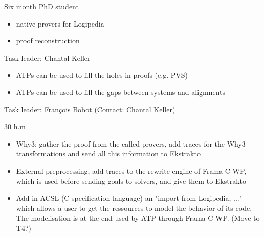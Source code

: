 \begin{workpackage}[id=atpetc,wphases=0-48,type=RTD,
  short=ATPs etc.,%
  title={ATP, SAT, SMT, Model checkers},
  lead=Lie,
  LieRM=10]
\begin{tasklist}
\begin{task}[id=reconstruction, title=ATPs for Logipedia]

  Six month PhD student

\begin{itemize}
\item native provers for Logipedia
\item proof reconstruction
\end{itemize}

\end{task}


\begin{task}[id=readiness, title=Using ATPs to increase Logipedia readiness]
  Task leader: Chantal Keller


\begin{itemize}
\item ATPs can be used to fill the holes in proofs (e.g. PVS)
\item ATPs can be used to fill the gaps between systems and alignments
\end{itemize}

\end{task}


\begin{task}[id=cooperation, title=Make ATPs cooperate]
  Task leader: François Bobot (Contact: Chantal Keller)

  30 h.m


\begin{itemize}
\item Why3: gather the proof from the called provers, add traces for the
  Why3 transformations and send all this information to Ekstrakto
\item External preprocessing, add traces to the rewrite engine of
  Frama-C-WP, which is used before sending goals to solvers, and give
  them to Ekstrakto
\item Add in ACSL (C specification language) an "import from Logipedia,
  ..." which allows a user to get the ressources to model the behavior
  of its code. The modelisation is at the end used by ATP through
  Frama-C-WP. (Move to T4?)
\end{itemize}

\end{task}
\end{tasklist}



\end{workpackage}
